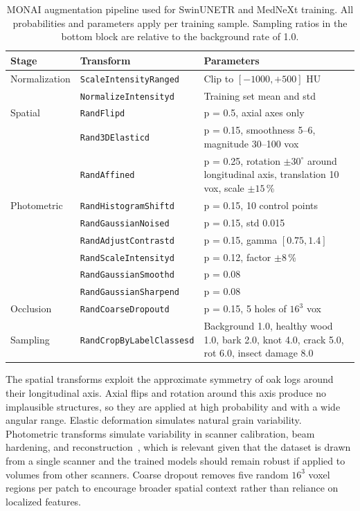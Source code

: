 \begin{table}[htbp]
\centering
\caption{MONAI augmentation pipeline used for SwinUNETR and MedNeXt training. All probabilities and parameters apply per training sample. Sampling ratios in the bottom block are relative to the background rate of 1.0.}
\label{tab:augmentation_pipeline}
\small
\begin{tabularx}{\textwidth}{llX}
    \toprule
    \textbf{Stage} & \textbf{Transform} & \textbf{Parameters} \\
    \midrule
    Normalization & \texttt{ScaleIntensityRanged} & Clip to $[-1000, +500]$ HU \\
                  & \texttt{NormalizeIntensityd}  & Training set mean and std \\
    \midrule
    Spatial       & \texttt{RandFlipd}            & p = 0.5, axial axes only \\
                  & \texttt{Rand3DElasticd}       & p = 0.15, smoothness 5--6, magnitude 30--100 vox \\
                  & \texttt{RandAffined}          & p = 0.25, rotation $\pm 30^\circ$ around longitudinal axis, translation 10 vox, scale $\pm 15$\,\% \\
    \midrule
    Photometric   & \texttt{RandHistogramShiftd}  & p = 0.15, 10 control points \\
                  & \texttt{RandGaussianNoised}   & p = 0.15, std 0.015 \\
                  & \texttt{RandAdjustContrastd}  & p = 0.15, gamma $[0.75, 1.4]$ \\
                  & \texttt{RandScaleIntensityd}  & p = 0.12, factor $\pm 8$\,\% \\
                  & \texttt{RandGaussianSmoothd}  & p = 0.08 \\
                  & \texttt{RandGaussianSharpend} & p = 0.08 \\
    \midrule
    Occlusion     & \texttt{RandCoarseDropoutd}   & p = 0.15, 5 holes of $16^3$ vox \\
    \midrule
    Sampling      & \texttt{RandCropByLabelClassesd} & Background 1.0, healthy wood 1.0, bark 2.0, knot 4.0, crack 5.0, rot 6.0, insect damage 8.0 \\
    \bottomrule
\end{tabularx}
\end{table}

The spatial transforms exploit the approximate symmetry of oak logs around their longitudinal axis. Axial flips and rotation around this axis produce no implausible structures, so they are applied at high probability and with a wide angular range. Elastic deformation simulates natural grain variability. Photometric transforms simulate variability in scanner calibration, beam hardening, and reconstruction~\cite{bushberg2011essential}, which is relevant given that the dataset is drawn from a single scanner and the trained models should remain robust if applied to volumes from other scanners. Coarse dropout removes five random $16^3$ voxel regions per patch to encourage broader spatial context rather than reliance on localized features.

